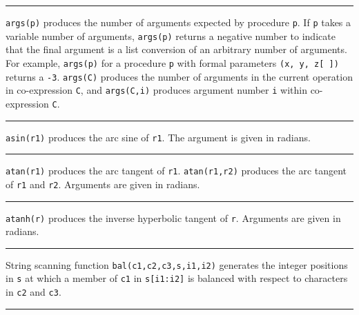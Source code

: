 \bigskip

\hrule\vspace{0.1cm}

\noindent
{}\texttt{args(p)} produces the number of arguments
expected by procedure \texttt{p}. If \texttt{p} takes a variable number
of arguments, \texttt{args(p)} returns a negative number to indicate
that the final argument is a list conversion of an arbitrary number of
arguments. For example, \texttt{args(p)} for a procedure \texttt{p}
with formal parameters \texttt{(x, y, z[ ])} returns a \texttt{{}-3}.
\texttt{args(C)} produces the number of arguments in the current
operation in co-expression \texttt{C}, and \texttt{args(C,i)} produces
argument number \texttt{i} within co-expression \texttt{C}.

\bigskip

\hrule\vspace{0.1cm}

\noindent
{}\texttt{asin(r1)} produces the arc sine of \texttt{r1}.
The argument is given in radians.

\bigskip

\hrule\vspace{0.1cm}

\noindent
{}\texttt{atan(r1)} produces the arc tangent of
\texttt{r1}. \texttt{atan(r1,r2)} produces the arc tangent of
\texttt{r1} and \texttt{r2}. Arguments are given in radians.

\bigskip\hrule\vspace{0.1cm}

\noindent
{}\texttt{atanh(r)} produces the inverse
hyperbolic tangent of \texttt{r}. Arguments are given in radians.

\bigskip\hrule\vspace{0.1cm}

\noindent
{}String scanning function
\texttt{bal(c1,c2,c3,s,i1,i2)} generates the integer positions in
\texttt{s} at which a member of \texttt{c1} in \texttt{s[i1:i2]} is
balanced with respect to characters in \texttt{c2} and \texttt{c3}.

\bigskip\hrule\vspace{0.1cm}

